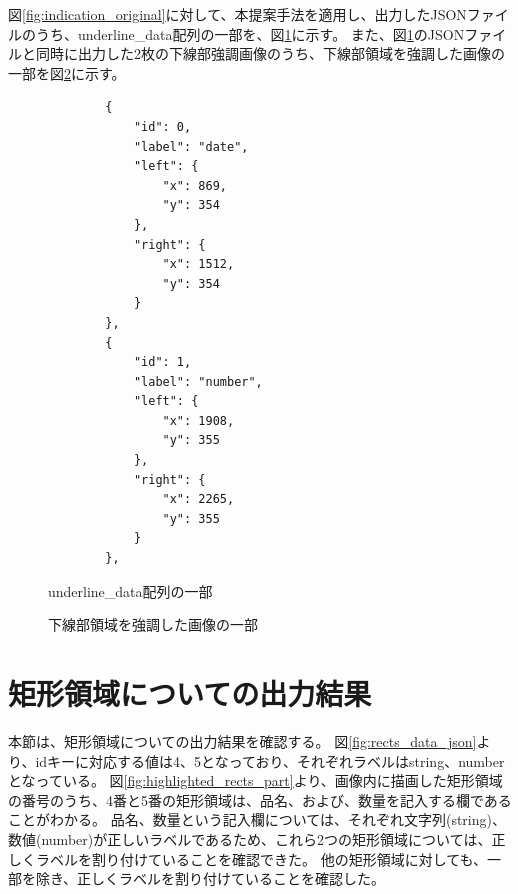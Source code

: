 図\ref{fig:indication_original}に対して、本提案手法を適用し、出力したJSONファイルのうち、underline\_data配列の一部を、図\ref{fig:underlines_data_json}に示す。
また、図\ref{fig:underlines_data_json}のJSONファイルと同時に出力した2枚の下線部強調画像のうち、下線部領域を強調した画像の一部を図\ref{fig:highlighted_underlines_part}に示す。

\lstset{language=}
\begin{figure}[t]
    \begin{lstlisting}
        {
            "id": 0,
            "label": "date",
            "left": {
                "x": 869,
                "y": 354
            },
            "right": {
                "x": 1512,
                "y": 354
            }
        },
        {
            "id": 1,
            "label": "number",
            "left": {
                "x": 1908,
                "y": 355
            },
            "right": {
                "x": 2265,
                "y": 355
            }
        },
    \end{lstlisting}
    \caption{underline\_data配列の一部}\label{fig:underlines_data_json}
\end{figure}

\begin{figure}[t]
    \begin{center}
        \caption{下線部領域を強調した画像の一部}
        \label{fig:highlighted_underlines_part}
    \end{center}
\end{figure}

\section{矩形領域についての出力結果}\label{sec:result_rect}
本節は、矩形領域についての出力結果を確認する。
図\ref{fig:rects_data_json}より、idキーに対応する値は4、5となっており、それぞれラベルはstring、numberとなっている。
図\ref{fig:highlighted_rects_part}より、画像内に描画した矩形領域の番号のうち、4番と5番の矩形領域は、品名、および、数量を記入する欄であることがわかる。
品名、数量という記入欄については、それぞれ文字列(string)、数値(number)が正しいラベルであるため、これら2つの矩形領域については、正しくラベルを割り付けていることを確認できた。
他の矩形領域に対しても、一部を除き、正しくラベルを割り付けていることを確認した。

